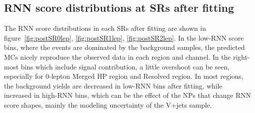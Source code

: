 \subsection{RNN score distributions at SRs after fitting}
The RNN score distributions in each SRs after fitting are shown in figure~\ref{fig:postSR0lep}, \ref{fig:postSR1lep}, \ref{fig:postSR2lep}.
In the low-RNN score bins, where the events are dominated by the background samples, the predicted MCs nicely reproduce the observed data in each region and channel. In the right-most bins which include signal contribution, a little overshoot can be seen, especially for 0-lepton Merged HP region and Resolved region. In most regions, the background yields are decreased in low-RNN bins after fitting, while increased in high-RNN bins, which can be the effect of the NPs that change RNN score shapes, mainly the modeling uncertainty of the V+jets sample.

